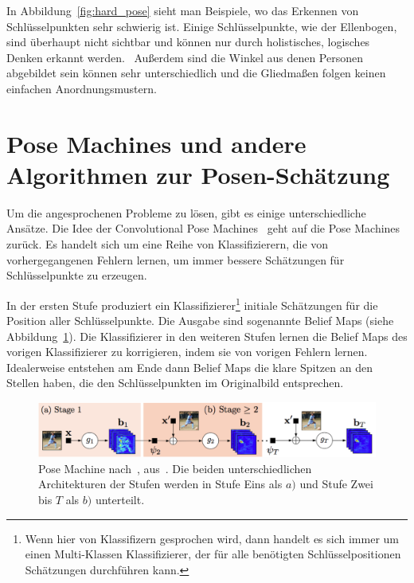 \documentclass[journal, a4paper]{IEEEtran}
\begin{document}
        In Abbildung~\ref{fig:hard_pose} sieht man Beispiele, wo das Erkennen von Schlüsselpunkten sehr schwierig ist. Einige Schlüsselpunkte, wie der Ellenbogen, sind überhaupt nicht sichtbar und können nur durch holistisches, logisches Denken erkannt werden.~\cite{toshev2014deeppose} Außerdem sind die Winkel aus denen Personen abgebildet sein können sehr unterschiedlich und die Gliedmaßen folgen keinen einfachen Anordnungsmustern.


\section{Pose Machines und andere Algorithmen zur Posen-Schätzung}
        Um die angesprochenen Probleme zu lösen, gibt es einige unterschiedliche Ansätze. %
        Die Idee der Convolutional Pose Machines~\cite{conv_pose} geht auf die Pose Machines~\cite{ramakrishna2014pose} zurück. Es handelt sich um eine Reihe von Klassifizierern, die von vorhergegangenen Fehlern lernen, um immer bessere Schätzungen für Schlüsselpunkte zu erzeugen. 

        In der ersten Stufe produziert ein Klassifizierer\footnote{Wenn hier von Klassifizern gesprochen wird, dann handelt es sich immer um einen Multi-Klassen Klassifizierer, der für alle benötigten Schlüsselpositionen Schätzungen durchführen kann.} initiale Schätzungen für die Position aller Schlüsselpunkte. Die Ausgabe sind sogenannte Belief Maps (siehe Abbildung~\ref{fig:pose_machine}). Die Klassifizierer in den weiteren Stufen lernen die Belief Maps des vorigen Klassifizierer zu korrigieren, indem sie von vorigen Fehlern lernen. Idealerweise entstehen am Ende dann Belief Maps die klare Spitzen an den Stellen haben, die den Schlüsselpunkten im Originalbild entsprechen.

        \begin{figure}[!hbt]
                \begin{center}
                \includegraphics[width=1\columnwidth]{pose_machine.png}
                \caption{Pose Machine nach~\cite{ramakrishna2014pose}, aus~\cite{conv_pose}. Die beiden unterschiedlichen Architekturen der Stufen werden in Stufe Eins als $a)$ und Stufe Zwei bis $T$ als $b)$ unterteilt.}
                \label{fig:pose_machine}
                
                \end{center}
        \end{figure}
\end{document}
